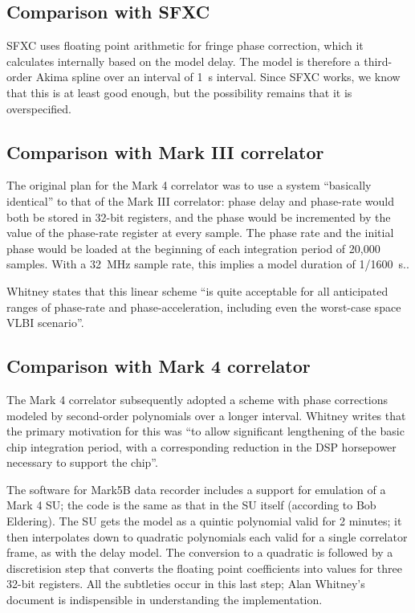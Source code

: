 \documentclass[a4paper]{article}
\begin{document}
\subsection{Comparison with SFXC}
SFXC uses floating point arithmetic for fringe phase
correction, which it calculates internally based on the model delay.
The model is therefore a third-order Akima spline over an interval of
1~s interval.  Since SFXC works, we know that this is at
least good enough, but the possibility remains that it is
overspecified.

\subsection{Comparison with Mark III correlator}
The original plan for the Mark 4 correlator was to use a system
``basically identical''\cite{m101} to that of the Mark III correlator:
phase delay and phase-rate would both be stored in 32-bit registers,
and the phase would be incremented by the value of the phase-rate
register at every sample.  The phase rate and the initial phase would
be loaded at the beginning of each integration period of 20,000
samples.  With a 32~MHz sample rate, this implies a model duration of
1/1600~s..

Whitney states\cite{m101} that this linear scheme ``is quite acceptable for all anticipated ranges of phase-rate and phase-acceleration, including even the worst-case space VLBI scenario''.

\subsection{Comparison with Mark 4 correlator}
The Mark 4 correlator subsequently adopted a scheme with phase
corrections modeled by second-order polynomials over a longer
interval.  Whitney writes\cite{m101} that the primary motivation for
this was ``to allow significant lengthening of the basic chip
integration period, with a corresponding reduction in the DSP
horsepower necessary to support the chip''.

The software for Mark5B data recorder includes a support for emulation
of a Mark 4 SU; the code is the same as that in the SU itself
(according to Bob Eldering).  The SU gets the model as a quintic
polynomial valid for 2 minutes; it then interpolates down to quadratic
polynomials each valid for a single correlator frame, as with the
delay model.  The conversion to a quadratic is followed by a
discretision step that converts the floating point coefficients into
values for three 32-bit registers.  All the subtleties occur in this
last step; Alan Whitney's document \cite{m101} is indispensible in
understanding the implementation.
\end{document}
